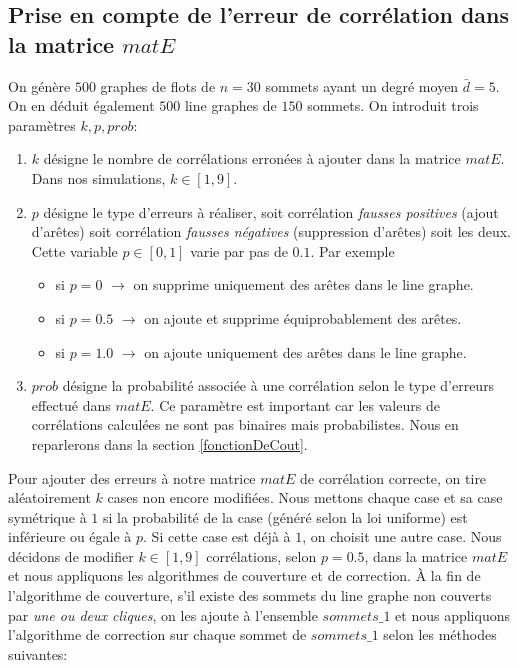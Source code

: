 \documentclass[onecolumn, 12pt]{book}
\begin{document}
\subsection{Prise en compte de l'erreur de corr\'elation dans la matrice $matE$}
On g\'en\`ere $500$ graphes de flots de $n = 30$ sommets ayant un degr\'e moyen $\bar d = 5$.
On en d\'eduit \'egalement $500$ line graphes de $150$ sommets.
On introduit trois param\`etres $k, p, prob$:
\begin{enumerate}
\item $k$ d\'esigne le nombre de corr\'elations erron\'ees \`a ajouter dans la matrice $matE$. Dans nos simulations, $k \in [1,9]$.
\item $p$ d\'esigne le type d'erreurs \`a r\'ealiser, soit corr\'elation {\em fausses positives} (ajout d'ar\^etes) soit corr\'elation {\em fausses n\'egatives} (suppression d'ar\^etes) soit les deux. Cette variable $p \in [0,1]$ varie par pas de $0.1$. Par exemple
	\begin{itemize}
	\item si $p=0$ $\rightarrow$ on supprime uniquement des ar\^etes dans le line graphe.
	\item si $p=0.5$ $\rightarrow$ on ajoute et supprime \'equiprobablement des ar\^etes.
	\item si $p=1.0$ $\rightarrow$ on ajoute uniquement des ar\^etes dans le line graphe.
	\end{itemize}
\item $prob$ d\'esigne la probabilit\'e associ\'ee \`a une corr\'elation selon le type d'erreurs effectu\'e dans $matE$. Ce param\`etre est important car les valeurs de corr\'elations calcul\'ees  ne sont pas binaires mais probabilistes. Nous en reparlerons dans la section \ref{fonctionDeCout}.
\end{enumerate}
Pour ajouter des erreurs \`a notre matrice $matE$ de corr\'elation correcte, on tire al\'eatoirement $k$ cases non encore modifi\'ees. Nous mettons chaque case et sa case sym\'etrique \`a $1$ si la probabilit\'e de la case (g\'en\'er\'e selon la loi uniforme) est inf\'erieure ou \'egale \`a $p$. Si cette case est d\'ej\`a \`a $1$, on choisit une autre case.
\newline
Nous d\'ecidons de modifier $k \in [1, 9]$ corr\'elations, selon $p=0.5$, dans la matrice $matE$ et nous appliquons les algorithmes de couverture et de correction.
\`A la fin de l'algorithme de couverture, s'il existe des sommets du line graphe non couverts par {\em une ou deux cliques}, on les ajoute \`a l'ensemble $sommets\_1$ et nous appliquons l'algorithme  de correction sur chaque sommet de $sommets\_1$ selon les m\'ethodes suivantes:
\end{document}
